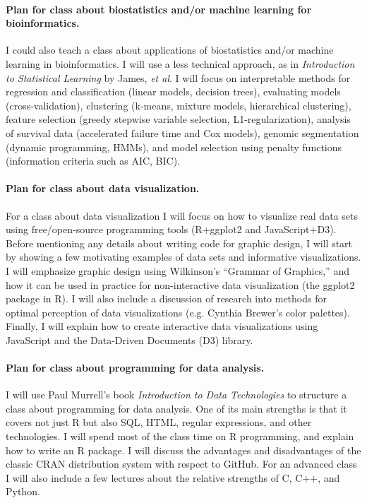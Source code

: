 \documentclass{article}
\begin{document}
\paragraph{Plan for class about biostatistics and/or machine learning for
  bioinformatics.}
I could also teach a class about applications of biostatistics and/or
machine learning in bioinformatics. I will use a less technical
approach, as in \emph{Introduction to Statistical Learning} by James,
\emph{et al}. I will focus on interpretable methods for regression and
classification (linear models, decision trees), evaluating models
(cross-validation), clustering (k-means, mixture models, hierarchical
clustering), feature selection (greedy stepwise variable selection,
L1-regularization), analysis of survival data (accelerated failure
time and Cox models), genomic segmentation (dynamic programming,
HMMs), and model selection using penalty functions (information
criteria such as AIC, BIC).

\paragraph{Plan for class about data visualization.} For a class about
data visualization I will focus on how to visualize real data sets
using free/open-source programming tools (R+ggplot2 and
JavaScript+D3). Before mentioning any details about writing code for
graphic design, I will start by showing a few motivating examples of
data sets and informative visualizations. I will emphasize graphic
design using Wilkinson's ``Grammar of Graphics,'' and how it can be
used in practice for non-interactive data visualization (the ggplot2
package in R). I will also include a discussion of research into
methods for optimal perception of data visualizations (e.g. Cynthia
Brewer's color palettes). Finally, I will explain how to create
interactive data visualizations using JavaScript and the Data-Driven
Documents (D3) library.

\paragraph{Plan for class about programming for data analysis.} I will
use Paul Murrell's book \emph{Introduction to Data Technologies} to
structure a class about programming for data analysis. One of its main
strengths is that it covers not just R but also SQL, HTML, regular
expressions, and other technologies. I will spend most of the class
time on R programming, and explain how to write an R package. I will
discuss the advantages and disadvantages of the classic CRAN
distribution system with respect to GitHub. For an advanced class I
will also include a few lectures about the relative strengths of C,
C++, and Python.
\end{document}
